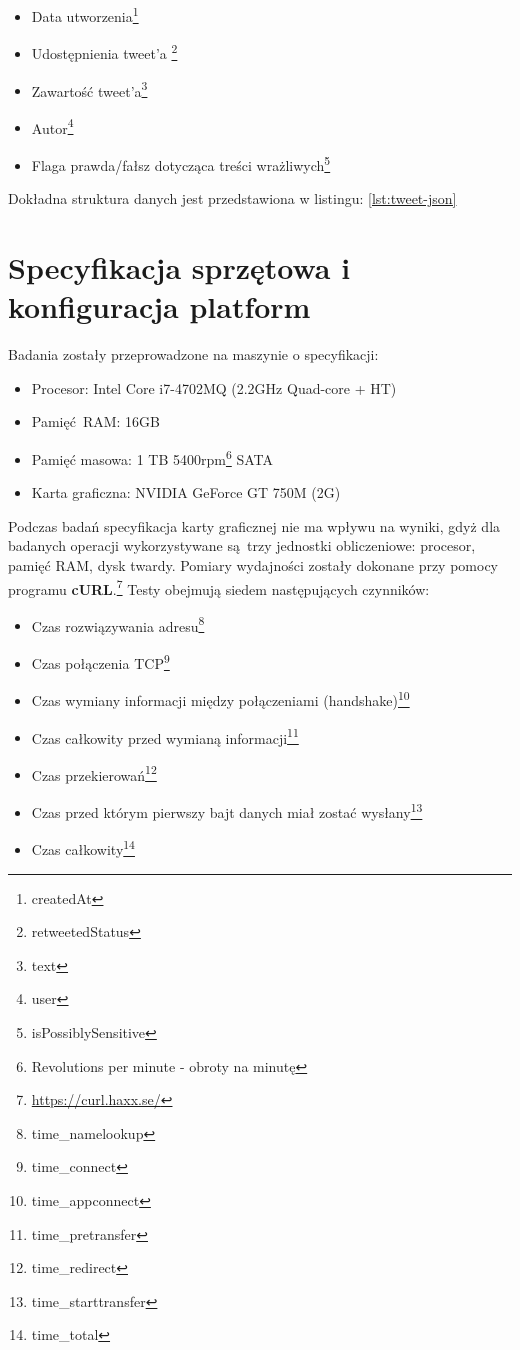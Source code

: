 \begin{itemize}\label{items:tweet-fields}
	\item Data utworzenia\footnote{createdAt}
	\item Udostępnienia tweet'a \footnote{retweetedStatus}
	\item Zawartość tweet'a\footnote{text}
	\item Autor\footnote{user}
	\item Flaga prawda/fałsz dotycząca treści wrażliwych\footnote{isPossiblySensitive}
\end{itemize}
Dokładna struktura danych jest przedstawiona w listingu: \ref{lst:tweet-json}
  
\section{Specyfikacja sprzętowa i konfiguracja platform}
Badania zostały przeprowadzone na maszynie o specyfikacji:
\begin{itemize}
	\item Procesor: Intel Core i7-4702MQ (2.2GHz Quad-core + HT) 
	\item Pamięć RAM: 16GB
	\item Pamięć masowa: 1 TB 5400rpm\footnote{Revolutions per minute - obroty na minutę} SATA
	\item Karta graficzna: NVIDIA GeForce GT 750M (2G)  
\end{itemize}
Podczas badań specyfikacja karty graficznej nie ma wpływu na wyniki, gdyż dla badanych operacji wykorzystywane są trzy jednostki obliczeniowe: procesor, pamięć RAM, dysk twardy.
\newline Pomiary wydajności zostały dokonane przy pomocy programu \textbf{cURL}.\footnote{\url{https://curl.haxx.se/}} Testy obejmują siedem następujących czynników:
\begin{itemize}\label{items:time-descriptions}
	\item{Czas rozwiązywania adresu\footnote{time\_namelookup}}
	\item{Czas połączenia TCP\footnote{time\_connect}}
	\item{Czas wymiany informacji między połączeniami (handshake)\footnote{time\_appconnect}} 
	\item{Czas całkowity przed wymianą informacji\footnote{time\_pretransfer}}
	\item{Czas przekierowań\footnote{time\_redirect}}
	\item{Czas przed którym pierwszy bajt danych miał zostać wysłany\footnote{time\_starttransfer}}
	\item{Czas całkowity\footnote{time\_total}}
\end{itemize}
